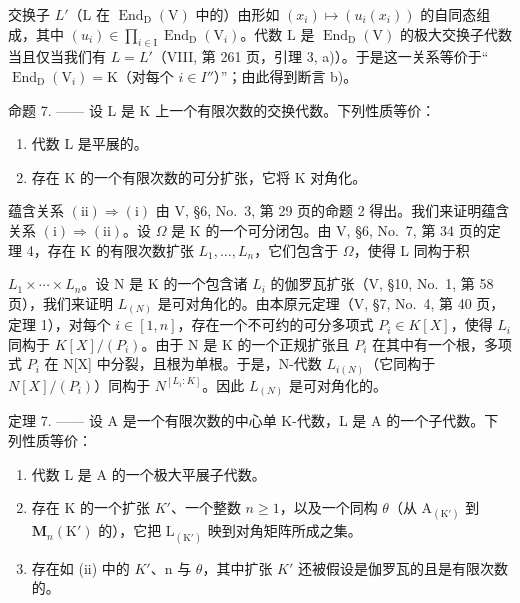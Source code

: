 交换子 \(L'\)（L 在 \(\operatorname{End}_{\mathrm{D}}(\mathrm{V})\) 中的）由形如 \((x_{i}) \mapsto (u_{i}(x_{i}))\) 的自同态组成，其中 \((u_{i}) \in \prod_{i \in \mathrm{I}} \operatorname{End}_{\mathrm{D}}(\mathrm{V}_{i})\)。代数 L 是 \(\operatorname{End}_{\mathrm{D}}(\mathrm{V})\) 的极大交换子代数当且仅当我们有 \(L = L'\)（VIII, 第 261 页，引理 3, a)）。于是这一关系等价于“\(\operatorname{End}_{\mathrm{D}}(\mathrm{V}_{i}) = \mathrm{K}\)（对每个 \(i \in I''\)）”；由此得到断言 b)。

命题 7. —— 设 L 是 K 上一个有限次数的交换代数。下列性质等价：

\begin{enumerate}
\def\labelenumi{(\roman{enumi})}
\item
  代数 L 是平展的。
\item
  存在 K 的一个有限次数的可分扩张，它将 K 对角化。
\end{enumerate}

蕴含关系 \((\mathrm{ii})\Rightarrow(\mathrm{i})\) 由 V, §6, No.~3, 第 29 页的命题 2 得出。我们来证明蕴含关系 \((\mathrm{i})\Rightarrow(\mathrm{ii})\)。设 \(\Omega\) 是 K 的一个可分闭包。由 V, §6, No.~7, 第 34 页的定理 4，存在 K 的有限次数扩张 \(L_{1},\ldots,L_{n}\)，它们包含于 \(\Omega\)，使得 L 同构于积

\(L_{1} \times \cdots \times L_{n}\)。设 N 是 K 的一个包含诸 \(L_{i}\) 的伽罗瓦扩张（V, §10, No.~1, 第 58 页），我们来证明 \(L_{(N)}\) 是可对角化的。由本原元定理（V, §7, No.~4, 第 40 页，定理 1），对每个 \(i \in [1, n]\)，存在一个不可约的可分多项式 \(P_{i} \in K[X]\)，使得 \(L_{i}\) 同构于 \(K[X]/(P_{i})\)。由于 N 是 K 的一个正规扩张且 \(P_{i}\) 在其中有一个根，多项式 \(P_{i}\) 在 N{[}X{]} 中分裂，且根为单根。于是，N-代数 \(L_{i(N)}\)（它同构于 \(N[X]/(P_{i})\)）同构于 \(N^{[L_{i}:K]}\)。因此 \(L_{(N)}\) 是可对角化的。

定理 7. —— 设 A 是一个有限次数的中心单 K-代数，L 是 A 的一个子代数。下列性质等价：

\begin{enumerate}
\def\labelenumi{(\roman{enumi})}
\item
  代数 L 是 A 的一个极大平展子代数。
\item
  存在 K 的一个扩张 \(K'\)、一个整数 \(n \geqslant 1\)，以及一个同构 \(\theta\)（从 \(\mathrm{A}_{(\mathrm{K}')}\) 到 \(\mathbf{M}_{n}(\mathrm{K}')\) 的），它把 \(\mathrm{L}_{(\mathrm{K}')}\) 映到对角矩阵所成之集。
\item
  存在如 (ii) 中的 \(K'\)、n 与 \(\theta\)，其中扩张 \(K'\) 还被假设是伽罗瓦的且是有限次数的。
\end{enumerate}

